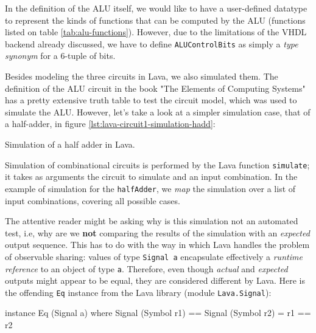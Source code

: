             In the definition of the ALU itself, we would like to have a user-defined datatype to
            represent the kinds of functions that can be computed by the ALU (functions listed on
            table \ref{tab:alu-functions}). However, due to the limitations of the VHDL backend
            already discussed, we have to define \texttt{ALUControlBits} as simply a \emph{type
                synonym} for a 6-tuple of bits.

            Besides modeling the three circuits in Lava, we also simulated them. The definition of
            the ALU circuit in the book "The Elements of Computing Systems"\cite{nand2tetris-book}
            has a pretty extensive truth table to test the circuit model, which was used to simulate
            the ALU. However, let's take a look at a simpler simulation case, that of a half-adder,
            in figure \ref{lst:lava-circuit1-simulation-hadd}:

            \begin{listing}[h!]
                \caption{Simulation of a half adder in Lava.
                    \label{lst:lava-circuit1-simulation-hadd}}
            \end{listing}

            Simulation of combinational circuits is performed by the Lava function
            \texttt{simulate}; it takes as arguments the circuit to simulate and an input
            combination. In the example of simulation for the \texttt{halfAdder}, we \emph{map} the
            simulation over a list of input combinations, covering all possible cases.

            The attentive reader might be asking why is this simulation not an automated test, i.e,
            why are we \textbf{not} comparing the results of the simulation with an \emph{expected}
            output sequence. This has to do with the way in which Lava handles the problem of
            observable sharing: values of type \texttt{Signal a} encapsulate effectively a
            \emph{runtime reference} to an object of type \texttt{a}. Therefore, even though
            \emph{actual} and \emph{expected} outputs might appear to be equal, they are considered
            different by Lava. Here is the offending \texttt{Eq} instance from the Lava library
            (module \texttt{Lava.Signal}):

            \begin{haskellcode}
    instance Eq (Signal a) where
        Signal (Symbol r1) == Signal (Symbol r2) = r1 == r2
            \end{haskellcode}

